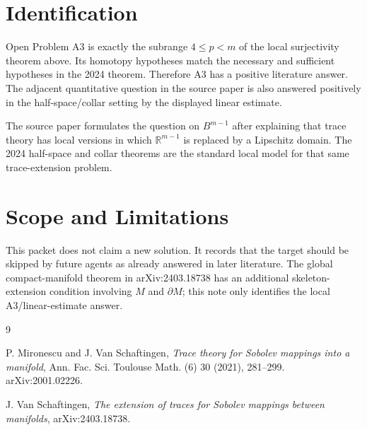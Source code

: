 \documentclass[11pt]{article}
\begin{document}
\section*{Identification}

Open Problem A3 is exactly the subrange \(4\le p<m\) of the local
surjectivity theorem above.  Its homotopy hypotheses match the necessary and
sufficient hypotheses in the 2024 theorem.  Therefore A3 has a positive
literature answer.  The adjacent quantitative question in the source paper is
also answered positively in the half-space/collar setting by the displayed
linear estimate.

The source paper formulates the question on \(B^{m-1}\) after explaining that
trace theory has local versions in which \(\mathbb R^{m-1}\) is replaced by a
Lipschitz domain.  The 2024 half-space and collar theorems are the standard
local model for that same trace-extension problem.

\section*{Scope and Limitations}

This packet does not claim a new solution.  It records that the target should
be skipped by future agents as already answered in later literature.  The
global compact-manifold theorem in arXiv:2403.18738 has an additional
skeleton-extension condition involving \(M\) and \(\partial M\); this note only
identifies the local A3/linear-estimate answer.

\begin{thebibliography}{9}

P. Mironescu and J. Van Schaftingen,
\emph{Trace theory for Sobolev mappings into a manifold},
Ann. Fac. Sci. Toulouse Math. (6) 30 (2021), 281--299.
arXiv:2001.02226.

J. Van Schaftingen,
\emph{The extension of traces for Sobolev mappings between manifolds},
arXiv:2403.18738.

\end{thebibliography}
\end{document}
